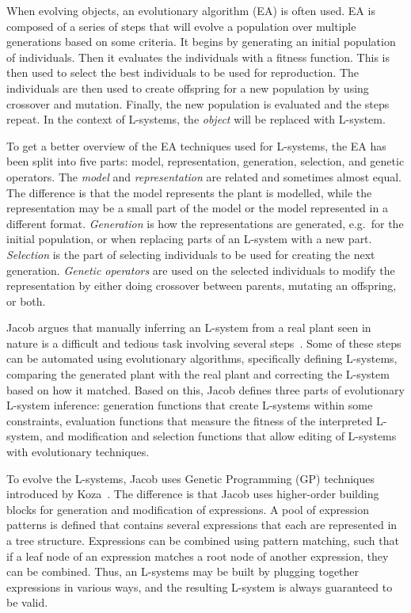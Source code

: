 When evolving objects, an evolutionary algorithm (EA) is often used.
EA is composed of a series of steps that will evolve a population over multiple generations based on some criteria.
It begins by generating an initial population of individuals.
Then it evaluates the individuals with a fitness function.
This is then used to select the best individuals to be used for reproduction.
The individuals are then used to create offspring for a new population by using crossover and mutation.
Finally, the new population is evaluated and the steps repeat.
In the context of L-systems, the \textit{object} will be replaced with L-system.

To get a better overview of the EA techniques used for L-systems, the EA has been split into five parts: model, representation, generation, selection, and genetic operators.
The \textit{model} and \textit{representation} are related and sometimes almost equal.
The difference is that the model represents the plant is modelled, while the representation may be a small part of the model or the model represented in a different format.
\textit{Generation} is how the representations are generated, e.g.\ for the initial population, or when replacing parts of an L-system with a new part.
\textit{Selection} is the part of selecting individuals to be used for creating the next generation.
\textit{Genetic operators} are used on the selected individuals to modify the representation by either doing crossover between parents, mutating an offspring, or both.

Jacob argues that manually inferring an L-system from a real plant seen in nature is a difficult and tedious task involving several steps~\cite{Jacob1998}.
Some of these steps can be automated using evolutionary algorithms, specifically defining L-systems, comparing the generated plant with the real plant and correcting the L-system based on how it matched.
Based on this, Jacob defines three parts of evolutionary L-system inference: generation functions that create L-systems within some constraints, evaluation functions that measure the fitness of the interpreted L-system, and modification and selection functions that allow editing of L-systems with evolutionary techniques.

To evolve the L-systems, Jacob uses Genetic Programming (GP) techniques introduced by Koza~\cite{Koza1993}.
The difference is that Jacob uses higher-order building blocks for generation and modification of expressions.
A pool of expression patterns is defined that contains several expressions that each are represented in a tree structure.
Expressions can be combined using pattern matching, such that if a leaf node of an expression matches a root node of another expression, they can be combined.
Thus, an L-systems may be built by plugging together expressions in various ways, and the resulting L-system is always guaranteed to be valid.


